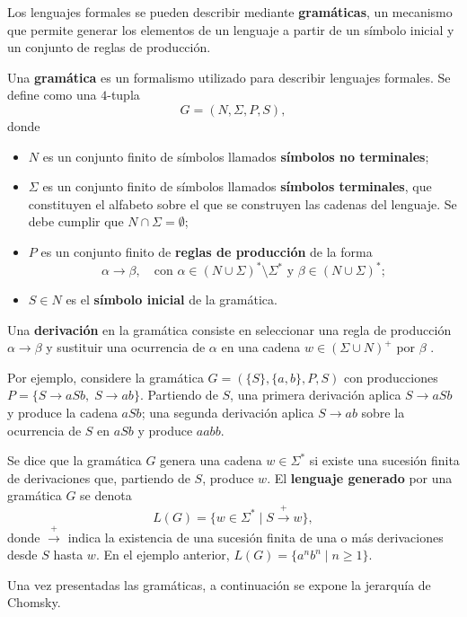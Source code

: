 Los lenguajes formales se pueden describir mediante \textbf{gramáticas},
un mecanismo que permite generar los elementos de un lenguaje a partir
de un símbolo inicial y un conjunto de reglas de producción.

\begin{definicion}
Una \textbf{gramática} es un formalismo utilizado para describir
lenguajes formales. Se define como una $4$-tupla
\[
  G = (N, \Sigma, P, S),
\]
donde
\begin{itemize}
  \item $N$ es un conjunto finito de símbolos llamados
    \textbf{símbolos no terminales};
  \item $\Sigma$ es un conjunto finito de símbolos llamados
    \textbf{símbolos terminales}, que constituyen el alfabeto sobre el
    que se construyen las cadenas del lenguaje. Se debe cumplir que
    $N \cap \Sigma = \emptyset$;
  \item $P$ es un conjunto finito de \textbf{reglas de producción} de la
    forma
    \[
      \alpha \to \beta,
      \quad \text{con } \alpha \in (N \cup \Sigma)^* \setminus \Sigma^*
      \text{ y } \beta \in (N \cup \Sigma)^*;
    \]
  \item $S \in N$ es el \textbf{símbolo inicial} de la gramática.
\end{itemize}
\end{definicion}

Una \textbf{derivación} en la gramática consiste en seleccionar una
regla de producción $\alpha \to \beta$ y sustituir una ocurrencia de
$\alpha$ en una cadena $w \in (\Sigma \cup N)^+$ por $\beta$
\cite{hopcroft2006introduction}.

Por ejemplo, considere la gramática $G = (\{S\}, \{a, b\}, P, S)$ con
producciones $P = \{S \to aSb,\; S \to ab\}$. Partiendo de $S$, una
primera derivación aplica $S \to aSb$ y produce la cadena $aSb$; una
segunda derivación aplica $S \to ab$ sobre la ocurrencia de $S$ en
$aSb$ y produce $aabb$.

Se dice que la gramática $G$ genera una cadena $w \in \Sigma^*$ si
existe una sucesión finita de derivaciones que, partiendo de $S$,
produce $w$. El \textbf{lenguaje generado} por una gramática $G$ se
denota
\[
  L(G) = \{ w \in \Sigma^* \mid S \xrightarrow{+} w \},
\]
donde $\xrightarrow{+}$ indica la existencia de una sucesión finita
de una o más derivaciones desde $S$ hasta $w$. En el ejemplo anterior,
$L(G) = \{a^n b^n \mid n \ge 1\}$.

Una vez presentadas las gramáticas, a continuación se expone la
jerarquía de Chomsky.

